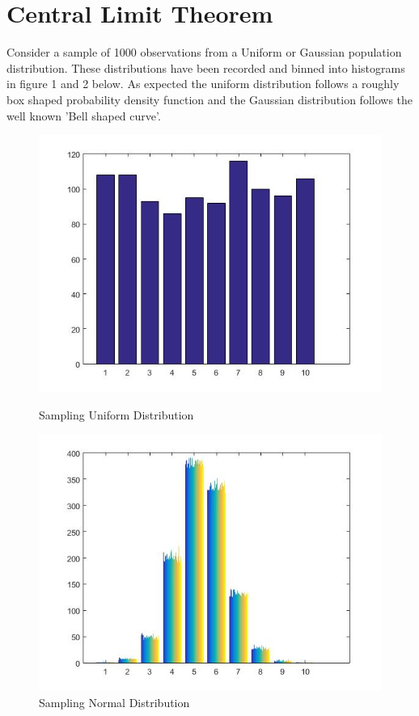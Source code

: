 \documentclass[10pt]{article}
\begin{document}
\section{Central Limit Theorem}
Consider a sample of 1000 observations from a Uniform or Gaussian population distribution. These distributions have been recorded and binned into histograms in figure 1 and 2 below. As expected the uniform distribution follows a roughly box shaped probability density function and the Gaussian distribution follows the well known 'Bell shaped curve'. 

%

\begin{figure}[!h]
  \centering
  \begin{minipage}[b]{0.4\textwidth}
    \includegraphics[width=\textwidth]{uniform.jpg}
    \caption{Sampling Uniform Distribution}
  \end{minipage}
  \hfill
  \begin{minipage}[b]{0.4\textwidth}
    \includegraphics[width=\textwidth]{gaussian.jpg}
    \caption{Sampling Normal Distribution}
  \end{minipage}
\end{figure}
\end{document}
